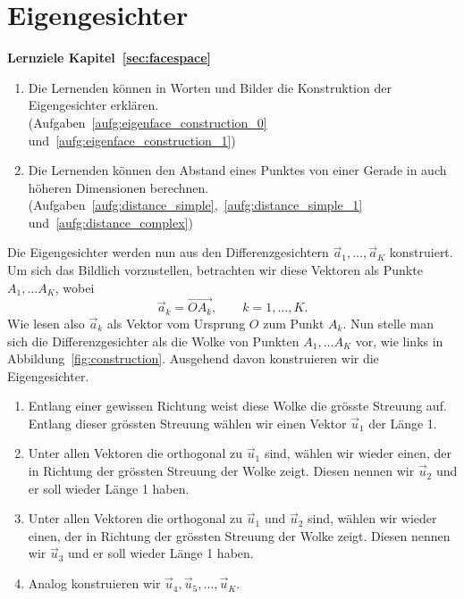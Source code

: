 \section{Eigengesichter} \label{sec:eigenfaces}
\begin{tcolorbox}
	\centerline{\textbf{Lernziele Kapitel~\ref{sec:facespace}}}
	\begin{enumerate}[leftmargin=*,label=\thesection.\arabic*]
		\item \label{item:eigenfaces} Die Lernenden können in Worten und Bilder die Konstruktion der Eigengesichter erklären.\\
		(Aufgaben~\ref{aufg:eigenface_construction_0} und~\ref{aufg:eigenface_construction_1})
		\item \label{item:distance} Die Lernenden können den Abstand eines Punktes von einer Gerade in auch höheren Dimensionen berechnen.\\
		(Aufgaben~\ref{aufg:distance_simple},~\ref{aufg:distance_simple_1} und~\ref{aufg:distance_complex})
	\end{enumerate}
\end{tcolorbox}
Die Eigengesichter werden nun aus den Differenzgesichtern $\vec a_1,\ldots,\vec a_K$ konstruiert.
Um sich das Bildlich vorzustellen, betrachten wir diese Vektoren als Punkte $A_1,\ldots A_K$, wobei
\begin{equation*}
	\vec{a}_k=\overrightarrow{OA_k},\qquad k=1,\ldots,K.
\end{equation*}
Wie lesen also $\vec{a}_k$ als Vektor vom Ursprung $O$ zum Punkt $A_k$.
Nun stelle man sich die Differenzgesichter als die \glqq{}Wolke\grqq{} von Punkten $A_1,\ldots A_K$ vor, wie links in Abbildung~\ref{fig:construction}.
Ausgehend davon konstruieren wir die Eigengesichter.
\begin{enumerate}[leftmargin=2cm, label=Schritt \arabic*]
	\item Entlang einer gewissen Richtung weist diese Wolke die grösste Streuung auf.
	Entlang dieser grössten Streuung wählen wir einen Vektor $\vec u_1$ der Länge 1.
	\item \label{item:u2} Unter allen Vektoren die orthogonal zu $\vec u_1$ sind, wählen wir wieder einen, der in Richtung der grössten Streuung der Wolke zeigt.
	Diesen nennen wir $\vec u_2$ und er soll wieder Länge 1 haben.
	\item Unter allen Vektoren die orthogonal zu $\vec u_1$ und $\vec u_2$ sind, wählen wir wieder einen, der in Richtung der grössten Streuung der Wolke zeigt.
	Diesen nennen wir $\vec u_3$ und er soll wieder Länge 1 haben.
	\item Analog konstruieren wir $\vec u_4,\vec u_5,\ldots,\vec u_K$.
\end{enumerate}

